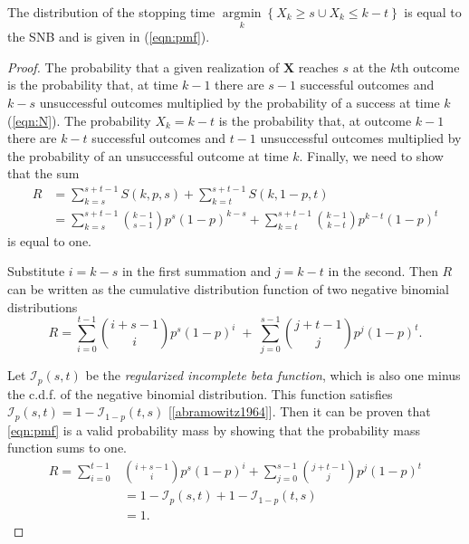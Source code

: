 \documentclass[12pt]{article}         %
\DeclareMathOperator*{\argmin}{argmin}
\newcommand*{\argminl}{\argmin\limits}
\begin{document}
\begin{prop}
The distribution of the stopping time 
$\argminl_k \left\{ X_k \geq s \cup X_k \leq k-t \right\}$ 
is equal to the SNB and is given in (\ref{eqn:pmf}). 
\end{prop}
\begin{proof}

The probability that a given realization of $\mathbf{X}$ reaches $s$ at 
the $k$th outcome is the probability that, at time $k-1$ there are $s-1$ 
successful outcomes and $k-s$ unsuccessful outcomes multiplied by 
the probability of a 
success at time $k$ (\ref{eqn:N}). The probability $X_k = k-t$ 
is the probability that, at outcome $k-1$ there are $k-t$ successful outcomes 
and $t-1$ unsuccessful outcomes multiplied by the probability of an 
unsuccessful outcome at time $k$.  Finally, we need to show that 
the sum
\begin{align} \label{eqn:sum_proof}
R &= \sum_{k=s}^{s+t-1} S(k, p, s) + \sum_{k=t}^{s+t-1} S(k, 1-p, t) \\
  &= \sum_{k=s}^{s+t-1} {k-1 \choose s-1} p^s (1-p)^{k-s} + \sum_{k=t}^{s+t-1} {k-1 \choose k-t} p^{k-t} (1-p)^t
\end{align}
is equal to one.

Substitute $i=k-s$ in the first summation and
$j=k-t$ in the second. 
Then $R$ can be written
as the cumulative distribution function of two 
negative binomial distributions
\begin{equation} \label{eqn:transformed_sum}
R = \sum_{i=0}^{t-1} {i+s-1 \choose i} p^s (1-p)^i \; + \;
\sum_{j=0}^{s-1} {j+t-1 \choose j} p^j (1-p)^t.
\end{equation}

Let $\mathcal{I}_p(s, t)$ be the {\em regularized incomplete beta function}, which is 
also one minus the c.d.f. of the negative binomial distribution. This
function satisfies $\mathcal{I}_p(s, t) = 1-\mathcal{I}_{1-p}(t, s)$
[\ref{abramowitz1964}].
Then it can be proven
that \ref{eqn:pmf} is a valid probability mass by showing that the
probability mass function sums to one.
\begin{align*}
R = \sum_{i=0}^{t-1} &{i+s-1 \choose i} p^s (1-p)^i +
\sum_{j=0}^{s-1}  {j+t-1 \choose j} p^j  (1-p)^t \\
   &= 1-\mathcal{I}_p(s, t) + 1 - \mathcal{I}_{1-p}(t, s) \\
   &= 1. 
\end{align*}
\end{proof}
\end{document}
